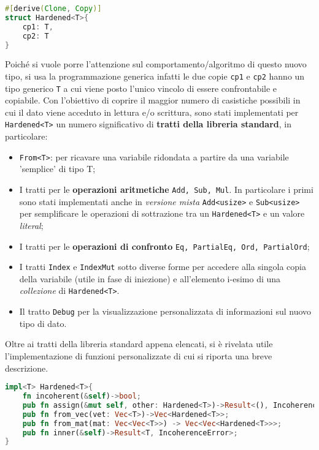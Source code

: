 \begin{lstlisting}[language=Rust, style=boxed]
#[derive(Clone, Copy)]
struct Hardened<T>{
    cp1: T, 
    cp2: T
}
\end{lstlisting}
\noindent
Poiché si vuole porre l'attenzione sul comportamento/algoritmo di questo nuovo tipo, si usa la programmazione generica infatti le due copie \texttt{cp1} e \texttt{cp2} hanno un tipo generico \texttt{T} a cui viene posto l'unico vincolo di essere confrontabile e copiabile.
Con l'obiettivo di coprire il maggior numero di casistiche possibili in cui il dato viene acceduto in lettura e/o scrittura, sono stati implementati per \texttt{Hardened<T>} un numero significativo di \textbf{tratti della libreria standard}, in particolare: 
\begin{itemize}
    \itemsep-0.3em
    \item \texttt{From<T>}: per ricavare una variabile ridondata a partire da una variabile 'semplice' di tipo T; 
    \item I tratti per le \textbf{operazioni aritmetiche} \texttt{Add, Sub, Mul}. In particolare i primi sono stati implementati anche in \textit{versione mista} \texttt{Add<usize>} e \texttt{Sub<usize>} per semplificare le operazioni di sottrazione tra un \texttt{Hardened<T>} e un valore \textit{literal}; 
    \item I tratti per le \textbf{operazioni di confronto} \texttt{Eq, PartialEq, Ord, PartialOrd}; 
    \item I tratti \texttt{Index} e \texttt{IndexMut} sotto diverse forme per accedere alla singola copia della variabile (utile in fase di iniezione) e all'elemento i-esimo di una \textit{collezione} di \texttt{Hardened<T>}.
    \item Il tratto \texttt{Debug} per la visualizzazione personalizzata di informazioni sul nuovo tipo di dato.
\end{itemize}

\noindent
Oltre ai tratti della libreria standard appena elencati,  si è rivelata utile l'implementazione di funzioni personalizzate di cui si riporta una breve descrizione.
\begin{lstlisting}[language=Rust, style=boxed]
impl<T> Hardened<T>{
    fn incoherent(&self)->bool;
    pub fn assign(&mut self, other: Hardened<T>)->Result<(), IncoherenceError>;
    pub fn from_vec(vet: Vec<T>)->Vec<Hardened<T>>;
    pub fn from_mat(mat: Vec<Vec<T>>) -> Vec<Vec<Hardened<T>>>;
    pub fn inner(&self)->Result<T, IncoherenceError>;
}
\end{lstlisting}

